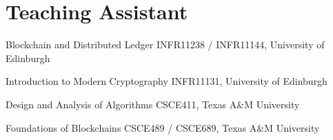 \section{Teaching Assistant}

{Blockchain and Distributed Ledger}
{}
{}
{}
{INFR11238 / INFR11144, University of Edinburgh}

{Introduction to Modern Cryptography}
{}
{}
{}
{INFR11131, University of Edinburgh}

{Design and Analysis of Algorithms}
{}
{}
{}
{CSCE411, Texas A\&M University}

{Foundations of Blockchains}
{}
{}
{}
{CSCE489 / CSCE689, Texas A\&M University}